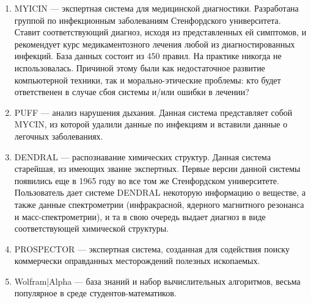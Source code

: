 \begin{enumerate}
\item{MYICIN --- экспертная система для медицинской диагностики. Разработана группой по инфекционным заболеваниям Стенфордского университета. Ставит соответствующий диагноз, исходя из представленных ей симптомов, и рекомендует курс медикаментозного лечения любой из диагностированных инфекций. База данных состоит из 450 правил. На практике никогда не использовалась. Причиной этому были как недостаточное развитие компьютерной техники, так и морально-этические проблемы: кто будет ответственен в случае сбоя системы и/или ошибки в лечении?}

\item{PUFF --- анализ нарушения дыхания. Данная система представляет собой MYCIN, из которой удалили данные по инфекциям и вставили данные о легочных заболеваниях.}

\item{DENDRAL --- распознавание химических структур. Данная система старейшая, из имеющих звание экспертных. Первые версии данной системы появились еще в 1965 году во все том же Стенфордском университете. Пользователь дает системе DENDRAL некоторую информацию о веществе, а также данные спектрометрии (инфракрасной, ядерного магнитного резонанса и масс-спектрометрии), и та в свою очередь выдает диагноз в виде соответствующей химической структуры.}

\item{PROSPECTOR --- экспертная система, созданная для содействия поиску коммерчески оправданных месторождений полезных ископаемых.}

\item{Wolfram|Alpha --- база знаний и набор вычислительных алгоритмов, весьма популярное в среде студентов-математиков.}

\end{enumerate}
